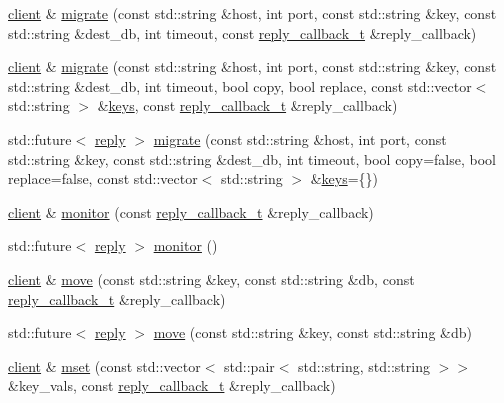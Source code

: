 \begin{DoxyCompactItemize}
\hyperlink{classcpp__redis_1_1client}{client} \& \hyperlink{classcpp__redis_1_1client_acfbf3cb40c0cd532e42d725bbda9a03a}{migrate} (const std\+::string \&host, int port, const std\+::string \&key, const std\+::string \&dest\+\_\+db, int timeout, const \hyperlink{classcpp__redis_1_1client_a061a1140d36d2eaeda82b09a0bb3f9f2}{reply\+\_\+callback\+\_\+t} \&reply\+\_\+callback)
\item 
\hyperlink{classcpp__redis_1_1client}{client} \& \hyperlink{classcpp__redis_1_1client_a671442669b8fe540bfc7d02c05a74207}{migrate} (const std\+::string \&host, int port, const std\+::string \&key, const std\+::string \&dest\+\_\+db, int timeout, bool copy, bool replace, const std\+::vector$<$ std\+::string $>$ \&\hyperlink{classcpp__redis_1_1client_acb7845a206b2321e6919c2f38282c322}{keys}, const \hyperlink{classcpp__redis_1_1client_a061a1140d36d2eaeda82b09a0bb3f9f2}{reply\+\_\+callback\+\_\+t} \&reply\+\_\+callback)
\item 
std\+::future$<$ \hyperlink{classcpp__redis_1_1reply}{reply} $>$ \hyperlink{classcpp__redis_1_1client_a1bbf11a4ebd3dcf12d9846946e5c3545}{migrate} (const std\+::string \&host, int port, const std\+::string \&key, const std\+::string \&dest\+\_\+db, int timeout, bool copy=false, bool replace=false, const std\+::vector$<$ std\+::string $>$ \&\hyperlink{classcpp__redis_1_1client_acb7845a206b2321e6919c2f38282c322}{keys}=\{\})
\item 
\hyperlink{classcpp__redis_1_1client}{client} \& \hyperlink{classcpp__redis_1_1client_ad99627cb477d71f07fae0f88ed8ed85b}{monitor} (const \hyperlink{classcpp__redis_1_1client_a061a1140d36d2eaeda82b09a0bb3f9f2}{reply\+\_\+callback\+\_\+t} \&reply\+\_\+callback)
\item 
std\+::future$<$ \hyperlink{classcpp__redis_1_1reply}{reply} $>$ \hyperlink{classcpp__redis_1_1client_afd727179e9ee9348ced168a9ac70cbf7}{monitor} ()
\item 
\hyperlink{classcpp__redis_1_1client}{client} \& \hyperlink{classcpp__redis_1_1client_ad84393d728fb69b527a1d7b009270b58}{move} (const std\+::string \&key, const std\+::string \&db, const \hyperlink{classcpp__redis_1_1client_a061a1140d36d2eaeda82b09a0bb3f9f2}{reply\+\_\+callback\+\_\+t} \&reply\+\_\+callback)
\item 
std\+::future$<$ \hyperlink{classcpp__redis_1_1reply}{reply} $>$ \hyperlink{classcpp__redis_1_1client_ab50d18d50ac6d0bb7b91347c3a574960}{move} (const std\+::string \&key, const std\+::string \&db)
\item 
\hyperlink{classcpp__redis_1_1client}{client} \& \hyperlink{classcpp__redis_1_1client_acd9e2a69abc97bb7735425fdaebe788d}{mset} (const std\+::vector$<$ std\+::pair$<$ std\+::string, std\+::string $>$$>$ \&key\+\_\+vals, const \hyperlink{classcpp__redis_1_1client_a061a1140d36d2eaeda82b09a0bb3f9f2}{reply\+\_\+callback\+\_\+t} \&reply\+\_\+callback)
$$
\end{DoxyCompactItemize}

